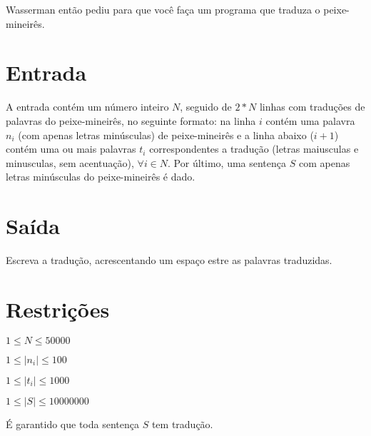 Wasserman então pediu para que você faça um programa que traduza o peixe-mineirês.

\section*{Entrada}

A entrada contém um número inteiro $N$, seguido de $2*N$ linhas com traduções de palavras
do peixe-mineirês, no seguinte formato: na linha $i$ contém uma palavra $n_i$ (com apenas letras
minúsculas) de peixe-mineirês e a linha abaixo ($i+1$) contém uma ou mais palavras $t_i$ correspondentes 
a tradução (letras maiusculas e minusculas, sem acentuação), $\forall i \in N$. Por último, uma 
sentença $S$ com apenas letras minúsculas do peixe-mineirês é dado. 

\section*{Saída}

Escreva a tradução, acrescentando um espaço estre as palavras traduzidas.

\section*{Restrições}

$1 \le N \le 50000$

$1 \le |n_i| \le 100$

$1 \le |t_i| \le 1000$

$1 \le |S| \le 10000000$ 

É garantido que toda sentença $S$ tem tradução.

\Example

\begin{example}
%
\end{example}

\begin{example}
%
\end{example}

